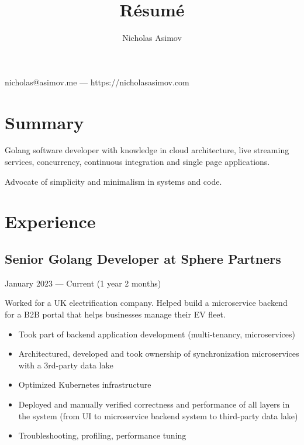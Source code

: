 \documentclass[a4paper,11pt]{article}
\makeatletter
\renewcommand{\maketitle}{
    \begin{center}
        {
            \huge
            \bfseries
            \theauthor
        }
 
        \vspace{.25em}
        nicholas@asimov.me --- https://nicholasasimov.com
    \end{center}
}
\makeatother
\begin{document}
\title{R\'esum\'e}
\author{Nicholas Asimov}

\maketitle

\section{Summary}

Golang software developer with knowledge in cloud architecture, live streaming services, concurrency,
continuous integration and single page applications.
\newline

\noindent
Advocate of simplicity and minimalism in systems and code.

\section{Experience}

\subsection{Senior Golang Developer at Sphere Partners}
January 2023 --- Current (1 year 2 months)

\vspace{3mm}
Worked for a UK electrification company. Helped build a microservice backend for a B2B portal that helps businesses manage their EV fleet.

\begin{itemize}[noitemsep]
    \renewcommand{\labelitemi}{---}

    \item Took part of backend application development (multi-tenancy, microservices)
    \item Architectured, developed and took ownership of synchronization microservices with a 3rd-party data lake
    \item Optimized Kubernetes infrastructure
    \item Deployed and manually verified correctness and performance of all layers in the system (from UI to microservice backend system to third-party data lake)
    \item Troubleshooting, profiling, performance tuning
\end{itemize}
\end{document}
